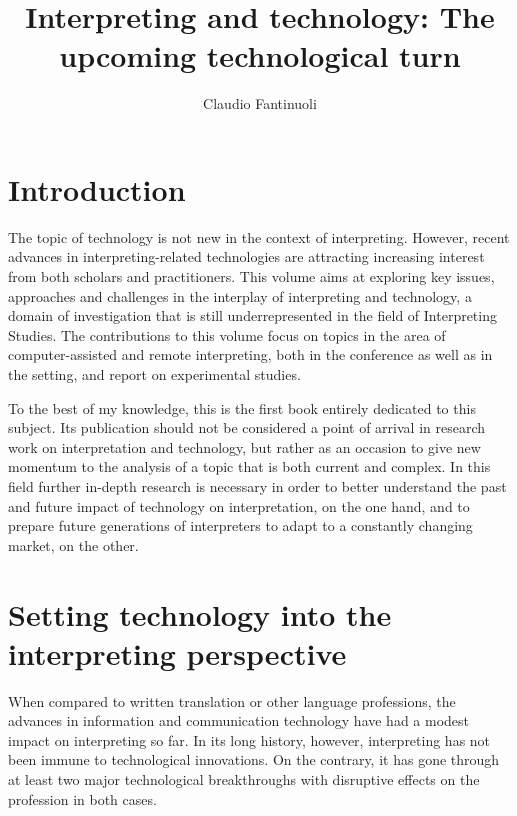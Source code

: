 \documentclass[output=paper]{langsci/langscibook}
\title{Interpreting and technology:\newlineCover{} The upcoming technological turn}
\author{Claudio Fantinuoli\affiliation{University of Mainz}}
\begin{document}
\maketitle


 

 
\section{Introduction} 
 
The topic of technology is not new in the context of interpreting. However, recent advances in interpreting-related technologies are attracting increasing interest from both scholars and practitioners. This volume aims at exploring key issues, approaches and challenges in the interplay of interpreting and technology, a domain of investigation that is still underrepresented in the field of Interpreting Studies. The contributions to this volume focus on topics in the area of computer-assisted and remote interpreting, both in the conference as well as in the  setting, and report on experimental studies.
 
To the best of my knowledge, this is the first book entirely dedicated to this subject. Its publication should not be considered a point of arrival in research work on interpretation and technology, but rather as an occasion to give new momentum to the analysis of a topic that is both current and complex. In this field further in-depth research is necessary in order to better understand the past and future impact of technology on interpretation, on the one hand, and to prepare future generations of interpreters to adapt to a constantly changing market, on the other.
 
\section{Setting technology into the interpreting perspective} 
When compared to written translation or other language professions, the advances in information and communication technology have had a modest impact on interpreting so far. In its long history, however, interpreting has not been immune to technological innovations. On the contrary, it has gone through at least two major technological breakthroughs with disruptive effects on the profession in both cases. 
 
\end{document}
